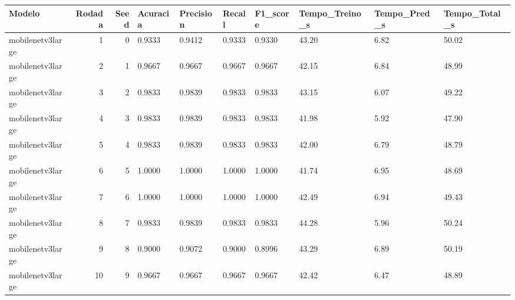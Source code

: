 \begin{tabular}{lrrlllllll}
\toprule
Modelo & Rodada & Seed & Acuracia & Precision & Recall & F1_score & Tempo_Treino_s & Tempo_Pred_s & Tempo_Total_s \\
\midrule
mobilenetv3large & 1 & 0 & 0.9333 & 0.9412 & 0.9333 & 0.9330 & 43.20 & 6.82 & 50.02 \\
mobilenetv3large & 2 & 1 & 0.9667 & 0.9667 & 0.9667 & 0.9667 & 42.15 & 6.84 & 48.99 \\
mobilenetv3large & 3 & 2 & 0.9833 & 0.9839 & 0.9833 & 0.9833 & 43.15 & 6.07 & 49.22 \\
mobilenetv3large & 4 & 3 & 0.9833 & 0.9839 & 0.9833 & 0.9833 & 41.98 & 5.92 & 47.90 \\
mobilenetv3large & 5 & 4 & 0.9833 & 0.9839 & 0.9833 & 0.9833 & 42.00 & 6.79 & 48.79 \\
mobilenetv3large & 6 & 5 & 1.0000 & 1.0000 & 1.0000 & 1.0000 & 41.74 & 6.95 & 48.69 \\
mobilenetv3large & 7 & 6 & 1.0000 & 1.0000 & 1.0000 & 1.0000 & 42.49 & 6.94 & 49.43 \\
mobilenetv3large & 8 & 7 & 0.9833 & 0.9839 & 0.9833 & 0.9833 & 44.28 & 5.96 & 50.24 \\
mobilenetv3large & 9 & 8 & 0.9000 & 0.9072 & 0.9000 & 0.8996 & 43.29 & 6.89 & 50.19 \\
mobilenetv3large & 10 & 9 & 0.9667 & 0.9667 & 0.9667 & 0.9667 & 42.42 & 6.47 & 48.89 \\
\bottomrule
\end{tabular}
